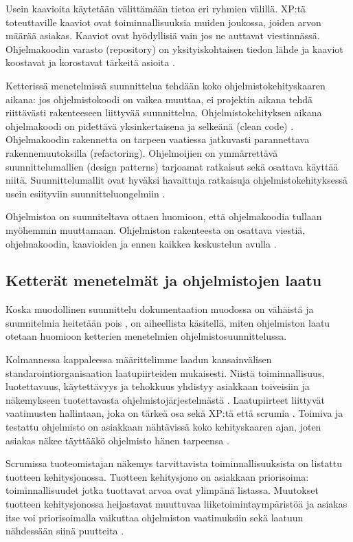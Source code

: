 \documentclass[finnish]{tktltiki2}
\theoremstyle{definition}
\theoremstyle{remark}
\begin{document}
{Usein kaavioita käytetään välittämään tietoa eri ryhmien välillä. XP:tä toteuttaville kaaviot ovat toiminnallisuuksia muiden joukossa, joiden arvon määrää asiakas. Kaaviot ovat hyödyllisiä vain jos ne auttavat viestinnässä. Ohjelmakoodin varasto (repository) on yksityiskohtaisen tiedon lähde ja kaaviot koostavat ja korostavat tärkeitä asioita \cite{FOW01b}.

Ketterissä menetelmissä suunnittelua tehdään koko ohjelmistokehityskaaren aikana: jos ohjelmistokoodi on vaikea muuttaa, ei projektin aikana tehdä riittävästi rakenteeseen liittyvää suunnittelua. Ohjelmistokehityksen aikana ohjelmakoodi on pidettävä yksinkertaisena ja selkeänä (clean code) \cite{FOW01b}.
Ohjelmakoodin rakennetta on tarpeen vaatiessa jatkuvasti parannettava rakennemuutoksilla (refactoring). Ohjelmoijien on ymmärrettävä suunnittelumallien (design patterns) tarjoamat ratkaisut sekä osattava käyttää niitä. Suunnittelumallit ovat hyväksi havaittuja ratkaisuja ohjelmistokehityksessä usein esiityviin suunnitteluongelmiin \cite{FOW01b}.

Ohjelmistoa on suunniteltava ottaen huomioon, että ohjelmakoodia tullaan myöhemmin muuttamaan. Ohjelmiston rakenteesta on osattava viestiä, ohjelmakoodin, kaavioiden ja ennen kaikkea keskustelun avulla \cite{FOW01b}.

\subsection{Ketterät menetelmät ja ohjelmistojen laatu}

Koska muodollinen suunnittelu dokumentaation muodossa on vähäistä ja suunnitelmia heitetään pois \cite{FOW01b}, on aiheellista käsitellä, miten ohjelmiston laatu otetaan huomioon ketterien menetelmien ohjelmistosuunnittelussa.

Kolmannessa kappaleessa määrittelimme laadun kansainvälisen standarointiorganisaation laatupiirteiden mukaisesti. Niistä toiminnallisuus, luotettavuus, käytettävyys ja tehokkuus yhdistyy asiakkaan toiveisiin ja näkemykseen tuotettavasta ohjelmisto\-järjestelmästä \cite{KIP96}. Laatupiirteet liittyvät vaatimusten hallintaan, joka on tärkeä osa sekä XP:tä \cite{BEC99} että scrumia \cite{SCH09}. Toimiva ja testattu ohjelmisto on asiakkaan nähtävissä koko kehityskaaren ajan, joten asiakas näkee täyttääkö ohjelmisto hänen tarpeensa \cite{BEC99}.

Scrumissa tuoteomistajan näkemys tarvittavista toiminnallisuuksista on listattu tuotteen kehitysjonossa. Tuotteen kehitysjono on asiakkaan priorisoima: toiminnallisuudet jotka tuottavat arvoa ovat ylimpänä listassa. Muutokset tuotteen kehitysjonossa heijastavat muuttuvaa liiketoimintaympäristöä ja asiakas itse voi priorisoimalla vaikuttaa ohjelmiston vaatimuksiin sekä laatuun nähdessään siinä puutteita \cite{SCH09}.

}
\end{document}
